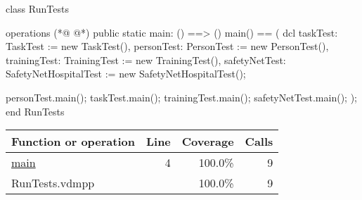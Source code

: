 \begin{vdmpp}[breaklines=true]
class RunTests

operations
(*@
\label{main:4}
@*)
 public static main: () ==> ()
   main() == (
    dcl taskTest: TaskTest := new TaskTest(), personTest: PersonTest := new PersonTest(), 
     trainingTest: TrainingTest := new TrainingTest(), safetyNetTest: SafetyNetHospitalTest := new SafetyNetHospitalTest();
    
    personTest.main();
    taskTest.main();    
    trainingTest.main();
    safetyNetTest.main();
   );
end RunTests
\end{vdmpp}
\bigskip
\begin{longtable}{|l|r|r|r|}
\hline
Function or operation & Line & Coverage & Calls \\
\hline
\hline
\hyperref[main:4]{main} & 4&100.0\% & 9 \\
\hline
\hline
RunTests.vdmpp & & 100.0\% & 9 \\
\hline
\end{longtable}

